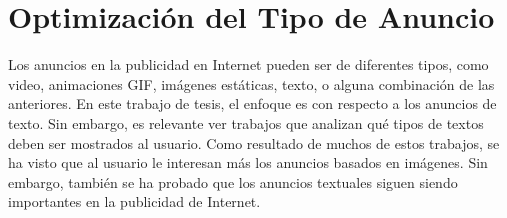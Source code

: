 




















\clearpage
\section{Optimización del Tipo de Anuncio}
\label{op-tipo}

Los anuncios en la publicidad en Internet pueden ser de diferentes
tipos, como video, animaciones GIF, imágenes estáticas, texto, o
alguna combinación de las anteriores. En este trabajo de tesis, el
enfoque es con respecto a los anuncios de texto. Sin embargo, es
relevante ver trabajos que analizan qué tipos de textos deben ser
mostrados al usuario. Como resultado de muchos de estos trabajos, se
ha visto que al usuario le interesan más los anuncios basados en
imágenes. Sin embargo, también se ha probado que los anuncios
textuales siguen siendo importantes en la publicidad de Internet.




